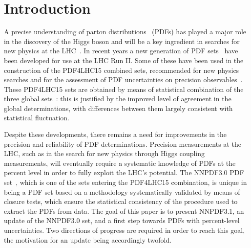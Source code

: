 \section{Introduction}
\label{sec:introduction}

A precise understanding of parton
distributions~\cite{Forte:2010dt,Forte:2013wc,Ball:2015oha} (PDFs) has 
played a major role in the discovery of the Higgs boson and will be a 
key ingredient in searches for new physics at the LHC~\cite{Rojo:2015acz}. In recent years a new
generation of PDF sets~\cite{Ball:2014uwa,Dulat:2015mca,Harland-Lang:2014zoa,Alekhin:2017kpj,Abramowicz:2015mha,Jimenez-Delgado:2014twa,Accardi:2016qay} have 
been developed for use at the LHC Run II.
Some of these have been used in the construction of the PDF4LHC15 
combined sets,  
recommended for new physics searches and for the assessment of PDF uncertainties on
precision observables~\cite{Butterworth:2015oua}.  These PDF4LHC15 sets are
obtained by means of statistical combination of the three global
sets~\cite{Ball:2014uwa,Dulat:2015mca,Harland-Lang:2014zoa}: this is
justified by the improved level of agreement in the global
determinations, with differences between 
them largely consistent with statistical fluctuation. 

Despite these developments, there remains a need for improvements in the precision and
reliability of PDF determinations. Precision measurements at the LHC, 
such as in the search for new physics through Higgs
coupling measurements, will eventually require a systematic knowledge of PDFs at the percent 
level in order to fully exploit the LHC's potential. 
The NNPDF3.0 PDF set~\cite{Ball:2014uwa}, which is one of the sets entering the PDF4LHC15
combination, is unique in being a PDF set based on a methodology 
systematically validated by means of closure tests, which ensure the
statistical consistency of the procedure used to extract the PDFs from data.
The goal of this paper is to present NNPDF3.1, an update of the
NNPDF3.0 set, and  
a first step towards PDFs with percent-level uncertainties. Two directions of
progress are required in order to reach
this goal, the motivation for an update being accordingly twofold.

